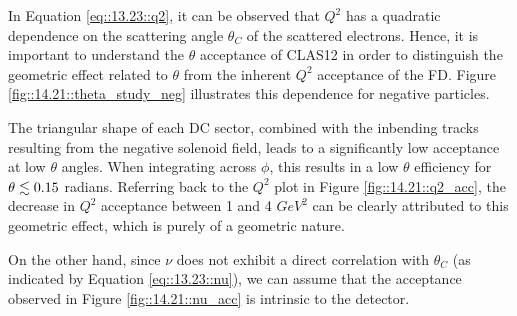     In Equation \eqref{eq::13.23::q2}, it can be observed that $Q^2$ has a quadratic dependence on the scattering angle $\theta_C$ of the scattered electrons.%
    Hence, it is important to understand the $\theta$ acceptance of CLAS12 in order to distinguish the geometric effect related to $\theta$ from the inherent $Q^2$ acceptance of the FD.
    Figure \ref{fig::14.21::theta_study_neg} illustrates this dependence for negative particles.

    The triangular shape of each DC sector, combined with the inbending tracks resulting from the negative solenoid field, leads to a significantly low acceptance at low $\theta$ angles.
    When integrating across $\phi$, this results in a low $\theta$ efficiency for $\theta \lesssim 0.15$ radians.
    Referring back to the $Q^2$ plot in Figure \ref{fig::14.21::q2_acc}, the decrease in $Q^2$ acceptance between 1 and 4 $GeV^2$ can be clearly attributed to this geometric effect, which is purely of a geometric nature.

    On the other hand, since $\nu$ does not exhibit a direct correlation with $\theta_C$ (as indicated by Equation \eqref{eq::13.23::nu}), we can assume that the acceptance observed in Figure \ref{fig::14.21::nu_acc} is intrinsic to the detector.
